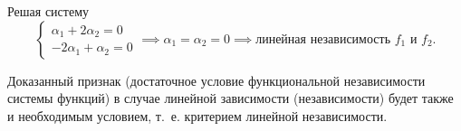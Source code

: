\documentclass[../../main.tex]{subfiles}
\begin{document}
\begin{examples}
\begin{enumerate}
		Решая систему
		\[ \begin{cases}
		\alpha_1 + 2\alpha_2 = 0 \\
		-2\alpha_1 + \alpha_2 = 0
		\end{cases} \implies \alpha_1 = \alpha_2 = 0 \implies
		\text{линейная независимость $f_1 \text{ и } f_2$.}
		\]
	\end{enumerate}
\end{examples}

\begin{remark}
	\;
	
	Доказанный признак (достаточное условие функциональной 
	независимости системы функций) 
	в случае линейной зависимости (независимости) будет также и 
	необходимым условием, т.~е. критерием линейной независимости.
\end{remark}
\end{document}
